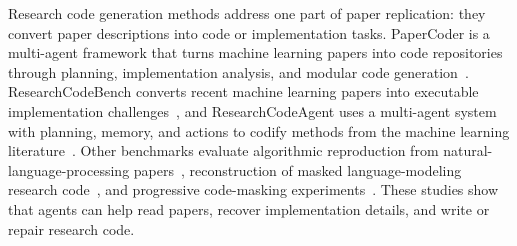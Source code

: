 \documentclass[authoryear,5p,times,nopreprintline]{elsarticle}
\begin{document}
Research code generation methods address one part of paper replication: they convert paper descriptions into code or implementation tasks.
PaperCoder is a multi-agent framework that turns machine learning papers into code repositories through planning, implementation analysis, and modular code generation~\citep{seo2025paper2code}.
ResearchCodeBench converts recent machine learning papers into executable implementation challenges~\citep{hua2026researchcodebench}, and ResearchCodeAgent uses a multi-agent system with planning, memory, and actions to codify methods from the machine learning literature~\citep{gandhi2025researchcodeagent}.
Other benchmarks evaluate algorithmic reproduction from natural-language-processing papers~\citep{xiang2025scireplicate}, reconstruction of masked language-modeling research code~\citep{yan2025lmr}, and progressive code-masking experiments~\citep{kim2025reproduction}.
These studies show that agents can help read papers, recover implementation details, and write or repair research code.
\end{document}
